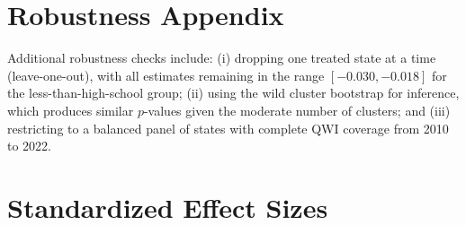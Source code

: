 \documentclass[12pt]{article}
\begin{document}
\section{Robustness Appendix}
\label{sec:robust_appendix}

Additional robustness checks include: (i) dropping one treated state at a time (leave-one-out), with all estimates remaining in the range $[-0.030, -0.018]$ for the less-than-high-school group; (ii) using the wild cluster bootstrap for inference, which produces similar $p$-values given the moderate number of clusters; and (iii) restricting to a balanced panel of states with complete QWI coverage from 2010 to 2022.

\section{Standardized Effect Sizes}
\label{sec:sde}


\end{document}
